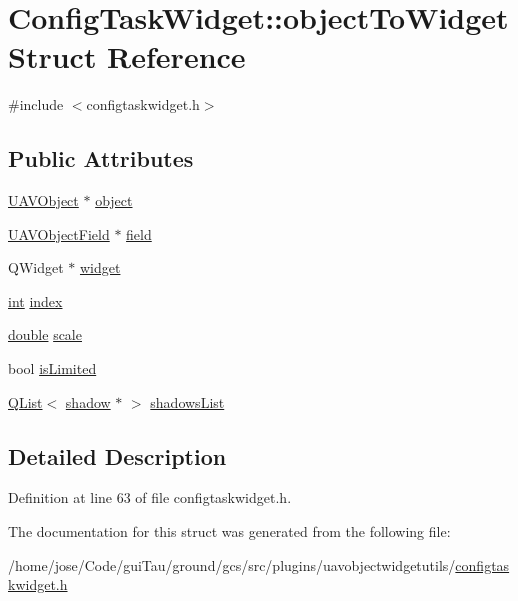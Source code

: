 \hypertarget{struct_config_task_widget_1_1object_to_widget}{\section{Config\-Task\-Widget\-:\-:object\-To\-Widget Struct Reference}
\label{struct_config_task_widget_1_1object_to_widget}
}


{\ttfamily \#include $<$configtaskwidget.\-h$>$}

\subsection*{Public Attributes}
\begin{DoxyCompactItemize}
\item 
\hyperlink{class_u_a_v_object}{U\-A\-V\-Object} $\ast$ \hyperlink{group___u_a_v_object_widget_utils_ga0a7a2adb310cdc6b0301dfad762a4f30}{object}
\item 
\hyperlink{class_u_a_v_object_field}{U\-A\-V\-Object\-Field} $\ast$ \hyperlink{group___u_a_v_object_widget_utils_ga36fdb22e759e0beae23ae99b03becb68}{field}
\item 
Q\-Widget $\ast$ \hyperlink{group___u_a_v_object_widget_utils_gac3c3016bdfda2c16ec8e356dd1a0882d}{widget}
\item 
\hyperlink{ioapi_8h_a787fa3cf048117ba7123753c1e74fcd6}{int} \hyperlink{group___u_a_v_object_widget_utils_ga32127d63078e835a69c50d20ea1a678b}{index}
\item 
\hyperlink{_super_l_u_support_8h_a8956b2b9f49bf918deed98379d159ca7}{double} \hyperlink{group___u_a_v_object_widget_utils_ga7981e8bb575a90d2a1491fd792108efe}{scale}
\item 
bool \hyperlink{group___u_a_v_object_widget_utils_ga22163ec4275b9b06770d4caead750ee4}{is\-Limited}
\item 
\hyperlink{class_q_list}{Q\-List}$<$ \hyperlink{struct_config_task_widget_1_1shadow}{shadow} $\ast$ $>$ \hyperlink{group___u_a_v_object_widget_utils_ga720684f6824db0612bacf1e3769c4ef3}{shadows\-List}
\end{DoxyCompactItemize}


\subsection{Detailed Description}


Definition at line 63 of file configtaskwidget.\-h.



The documentation for this struct was generated from the following file\-:\begin{DoxyCompactItemize}
\item 
/home/jose/\-Code/gui\-Tau/ground/gcs/src/plugins/uavobjectwidgetutils/\hyperlink{configtaskwidget_8h}{configtaskwidget.\-h}\end{DoxyCompactItemize}
